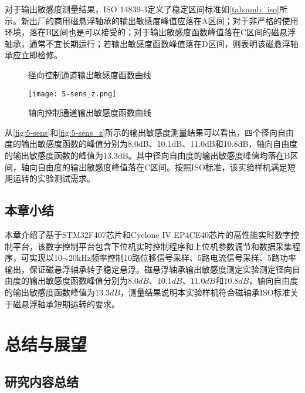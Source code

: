 \documentclass[
  lang=cn,
  degree=master,
  openany,oneside
]{nuaathesis}
\begin{document}
对于输出敏感度测量结果，ISO 14839-3定义了稳定区间标准如\autoref{tab:amb_iso}所示。新出厂的商用磁悬浮轴承的输出敏感度峰值应落在A区间；对于非严格的使用环境，落在B区间也是可以接受的；对于输出敏感度函数峰值落在C区间的磁悬浮轴承，通常不宜长期运行；若输出敏感度函数峰值落在D区间，则表明该磁悬浮轴承应立即检修。

\begin{figure}[h!]  
	\quad  
	\quad  	
	\quad  
	\quad  			
	\caption{径向控制通道输出敏感度函数曲线}  \label{fig:5-sens}
\end{figure}

\begin{figure}[h!]
	\texttt{[image: 5-sens\_z.png]}
	\caption{轴向控制通道输出敏感度函数曲线}
	\label{fig:5-sens_z}
\end{figure}

从\autoref{fig:5-sens}和\autoref{fig:5-sens_z}所示的输出敏感度测量结果可以看出，四个径向自由度的输出敏感度函数的峰值分别为8.0dB、10.1dB、11.0dB和10.8dB，轴向自由度的输出敏感度函数的峰值为13.3dB。其中径向自由度的输出敏感度峰值均落在B区间，轴向自由度的输出敏感度峰值落在C区间。按照ISO标准，该实验样机满足短期运转的实验测试需求。

\section{本章小结}
本章介绍了基于STM32F407芯片和Cyclone IV EP4CE40芯片的高性能实时数字控制平台，该数字控制平台包含下位机实时控制程序和上位机参数调节和数据采集程序，可实现以10$\sim$20kHz频率控制10路位移信号采样、5路电流信号采样、5路功率输出，保证磁悬浮轴承转子稳定悬浮。磁悬浮轴承输出敏感度测定实验测定径向自由度的输出敏感度函数峰值分别为$8.0dB$、$10.1dB$、$11.0dB$和$10.8dB$，轴向自由度的输出敏感度函数峰值为$13.3dB$，测量结果说明本实验样机符合磁轴承ISO标准关于磁悬浮轴承短期运转的要求。

\chapter{总结与展望}

\section{研究内容总结}
\end{document}
